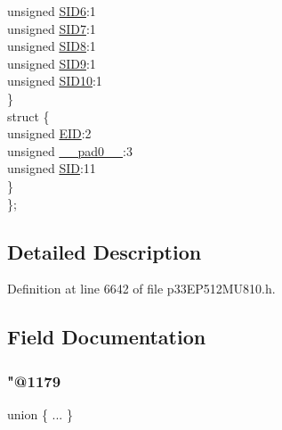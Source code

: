 \begin{DoxyCompactItemize}
\begin{tabbing}
\>\>unsigned \hyperlink{structtag_c2_r_x_f8_s_i_d_b_i_t_s_a70d70952133eb2389d5c326f9f0e8035}{SID6}:1\\
\>\>unsigned \hyperlink{structtag_c2_r_x_f8_s_i_d_b_i_t_s_a34097fb76decd431701fa2d86a22328e}{SID7}:1\\
\>\>unsigned \hyperlink{structtag_c2_r_x_f8_s_i_d_b_i_t_s_afe74894633244fdb0b0c01b4e8c522e7}{SID8}:1\\
\>\>unsigned \hyperlink{structtag_c2_r_x_f8_s_i_d_b_i_t_s_a33587704948067005c2a6a3ccc503c99}{SID9}:1\\
\>\>unsigned \hyperlink{structtag_c2_r_x_f8_s_i_d_b_i_t_s_a1a9084031c7f5fb16007feeebf0d8216}{SID10}:1\\
\>\} \\
\>struct \{\\
\>\>unsigned \hyperlink{structtag_c2_r_x_f8_s_i_d_b_i_t_s_ae80b378c9141f7c03e0b4e55b5f4b54d}{EID}:2\\
\>\>unsigned \hyperlink{structtag_c2_r_x_f8_s_i_d_b_i_t_s_adf71f3d8410c1f1dbbc96680a92c49af}{\_\_pad0\_\_}:3\\
\>\>unsigned \hyperlink{structtag_c2_r_x_f8_s_i_d_b_i_t_s_af88edf93b2fee2432665bd84f51287e4}{SID}:11\\
\>\} \\
\}; \\

\end{tabbing}\end{DoxyCompactItemize}


\subsection{Detailed Description}


Definition at line 6642 of file p33\+E\+P512\+M\+U810.\+h.



\subsection{Field Documentation}
\mbox{\label{structtag_c2_r_x_f8_s_i_d_b_i_t_s_ac988f082daddec95f30580d2002798fe}} 
\subsubsection{\texorpdfstring{"@1179}{@1179}}
{\footnotesize\ttfamily union \{ ... \} }

\mbox{\label{structtag_c2_r_x_f8_s_i_d_b_i_t_s_adf71f3d8410c1f1dbbc96680a92c49af}} 

